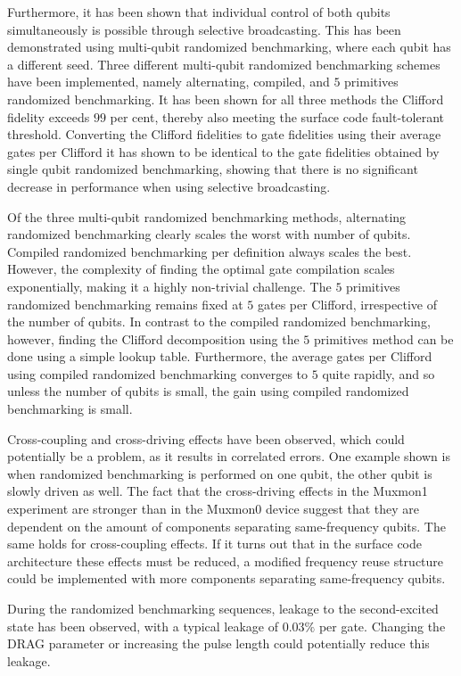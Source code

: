     Furthermore, it has been shown that individual control of both qubits simultaneously is possible through selective broadcasting. This has been demonstrated using multi-qubit randomized benchmarking, where each qubit has a different seed. Three different multi-qubit randomized benchmarking schemes have been implemented, namely alternating, compiled, and $5$ primitives randomized benchmarking. It has been shown for all three methods the Clifford fidelity exceeds $99$ per cent, thereby also meeting the surface code fault-tolerant threshold. Converting the Clifford fidelities to gate fidelities using their average gates per Clifford it has shown to be identical to the gate fidelities obtained by single qubit randomized benchmarking, showing that there is no significant decrease in performance when using selective broadcasting.

    Of the three multi-qubit randomized benchmarking methods, alternating randomized benchmarking clearly scales the worst with number of qubits. Compiled randomized benchmarking per definition always scales the best. However, the complexity of finding the optimal gate compilation scales exponentially, making it a highly non-trivial challenge. The $5$ primitives randomized benchmarking remains fixed at $5$ gates per Clifford, irrespective of the number of qubits. In contrast to the compiled randomized benchmarking, however, finding the Clifford decomposition using the $5$ primitives method can be done using a simple lookup table. Furthermore, the average gates per Clifford using compiled randomized benchmarking converges to $5$ quite rapidly, and so unless the number of qubits is small, the gain using compiled randomized benchmarking is small.

    Cross-coupling and cross-driving effects have been observed, which could potentially be a problem, as it results in correlated errors. One example shown is when randomized benchmarking is performed on one qubit, the other qubit is slowly driven as well. The fact that the cross-driving effects in the Muxmon1 experiment are stronger than in the Muxmon0 device suggest that they are dependent on the amount of components separating same-frequency qubits. The same holds for cross-coupling effects. If it turns out that in the surface code architecture these effects must be reduced, a modified frequency reuse structure could be implemented with more components separating same-frequency qubits.

    During the randomized benchmarking sequences, leakage to the second-excited state has been observed, with a typical leakage of $0.03\%$ per gate. Changing the DRAG parameter or increasing the pulse length could potentially reduce this leakage.

